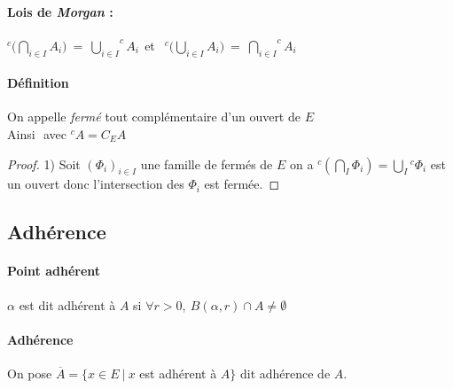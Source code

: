 		\medskip
		
		\paragraph{Lois de \emph{\emph{Morgan}} : }
			$^c\Big(\bigcap\limits_{i\in I} A_i \Big) ~=~ {\bigcup\limits_{i\in I}} ^cA_i ~~$et
			$~~ ^c\Big(\bigcup\limits_{i\in I} A_i \Big) ~=~ {\bigcap\limits_{i\in I}} ^cA_i$ 
			
		\traitd
		\paragraph{Définition}
			On appelle \emph{fermé} tout complémentaire d'un ouvert de $E$ \\
			Ainsi  ${}$ avec $^cA = C_E A$ 
		\trait
		
		
		\begin{proof}
		{\small 1)} Soit $\left( \Phi_i \right)_{i\in I}$ une famille de fermés de $E$ on a ${^c\left(\bigcap_I \Phi_i \right)} = 
		\bigcup_{I} {^c\Phi_i}$ est un ouvert donc l'intersection des $\Phi_i$ est fermée.
		\end{proof} \medskip
	
	\subsection{Adhérence}
	
		\traitd
		\paragraph{Point adhérent} $\alpha$ est dit adhérent à $A$ si $\forall r>0 ,~B(\alpha ,r) \cap A \neq \emptyset$ 
		\traitdouble
		\paragraph{Adhérence} On pose $\overline{A} = \{ x\in E ~\vert ~x$ est adhérent à $A\}$ dit adhérence de $A$. 
		\trait
		
		 \medskip
		
		
